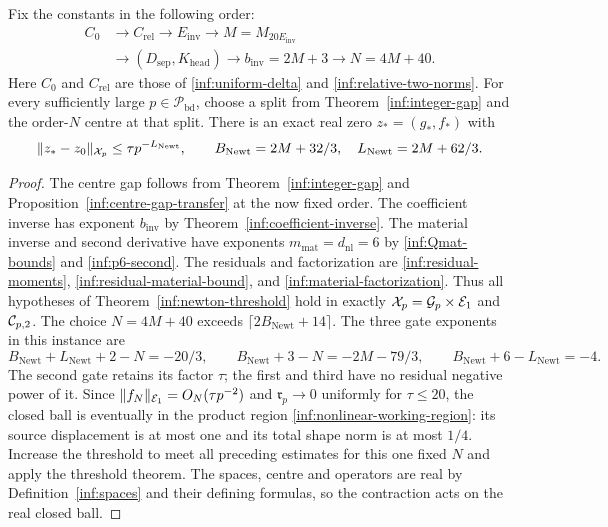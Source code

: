 \begin{corollary}
\label{inf:Newton-zero}
Fix the constants in the following order:
\begin{equation}\label{inf:constant-order}
 \begin{aligned}
 C_0&\longrightarrow C_{\mathrm{rel}}\longrightarrow
 E_{\mathrm{inv}}\longrightarrow M=M_{20E_{\mathrm{inv}}}\\
 &\longrightarrow (D_{\mathrm{sep}},K_{\mathrm{head}})
 \longrightarrow b_{\mathrm{inv}}=2M+3
 \longrightarrow N=4M+40.
 \end{aligned}
\end{equation}
Here $C_0$ and $C_{\mathrm{rel}}$ are those of
\eqref{inf:uniform-delta} and \eqref{inf:relative-two-norms}.
For every sufficiently large $p\in\mathcal P_{\mathrm{bd}}$, choose a split
from Theorem~\ref{inf:integer-gap} and the order-$N$ centre at
that split. There is an exact real zero $z_*=(g_*,f_*)$ with
\begin{equation}\label{inf:Newton-correction}
 \lVert z_*-z_0\rVert_{\mathcal X_p}\le\tau p^{-L_{\mathrm{Newt}}},\qquad
 B_{\mathrm{Newt}}=2M+32/3,\quad L_{\mathrm{Newt}}=2M+62/3.
\end{equation}
\end{corollary}
\begin{proof}
The centre gap follows from Theorem~\ref{inf:integer-gap} and
Proposition~\ref{inf:centre-gap-transfer} at the now fixed order.
The coefficient inverse has exponent $b_{\mathrm{inv}}$ by
Theorem~\ref{inf:coefficient-inverse}.
The material inverse and second derivative have exponents
$m_{\mathrm{mat}}=d_{\mathrm{nl}}=6$ by \eqref{inf:Qmat-bounds} and \eqref{inf:p6-second}.
The residuals and factorization are
\eqref{inf:residual-moments}, \eqref{inf:residual-material-bound},
and \eqref{inf:material-factorization}.
Thus all hypotheses of Theorem~\ref{inf:newton-threshold} hold
in exactly $\mathcal X_p=\mathcal{G}_p\times\mathcal E_1$ and $\mathcal C_{p,2}$.
The choice $N=4M+40$ exceeds
$\lceil2B_{\mathrm{Newt}}+14\rceil$.
The three gate exponents in this instance are
\[
 B_{\mathrm{Newt}}+L_{\mathrm{Newt}}+2-N=-20/3,\qquad
 B_{\mathrm{Newt}}+3-N=-2M-79/3,\qquad
 B_{\mathrm{Newt}}+6-L_{\mathrm{Newt}}=-4.
\]
The second gate retains its factor $\tau$; the first and third
have no residual negative power of it.
Since $\lVert f_N\rVert_{\mathcal E_1}=O_N(\tau p^{-2})$ and
$\mathfrak r_p\to0$ uniformly for $\tau\le20$, the closed ball
is eventually in the product region
\eqref{inf:nonlinear-working-region}: its source displacement is
at most one and its total shape norm is at most $1/4$. Increase the threshold to meet all preceding estimates
for this one fixed $N$ and apply the threshold theorem.
The spaces, centre and operators are real by
Definition~\ref{inf:spaces} and their defining formulas, so the
contraction acts on the real closed ball.
\end{proof}
